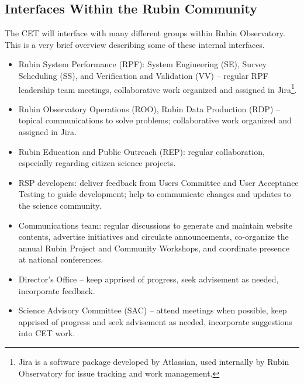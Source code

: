 \documentclass[DM,lsstdraft,toc]{lsstdoc}
\begin{document}
\subsection{Interfaces Within the Rubin Community}\label{ssec:mod_interface}

The CET will interface with many different groups within Rubin Observatory. 
This is a very brief overview describing some of these internal interfaces.
\begin{itemize}
\item Rubin System Performance (RPF): System Engineering (SE), Survey Scheduling (SS), and Verification and Validation (VV) -- regular RPF leadership team meetings, collaborative work organized and assigned in Jira\footnote{Jira is a software package developed by Atlassian, used internally by Rubin Observatory for issue tracking and work management.}.
\item Rubin Observatory Operations (ROO), Rubin Data Production (RDP) -- topical communications to solve problems; collaborative work organized and assigned in Jira.
\item Rubin Education and Public Outreach (REP): regular collaboration, especially regarding citizen science projects.
\item RSP developers: deliver feedback from Users Committee and User Acceptance Testing to guide development; help to communicate changes and updates to the science community.
\item Communications team: regular discussions to generate and maintain website contents, advertise initiatives and circulate announcements, co-organize the annual Rubin Project and Community Workshops, and coordinate presence at national conferences.
\item Director's Office -- keep apprised of progress, seek advisement as needed, incorporate feedback.
\item Science Advisory Committee (SAC) -- attend meetings when possible, keep apprised of progress and seek advisement as needed, incorporate suggestions into CET work.
\end{itemize}
\end{document}
